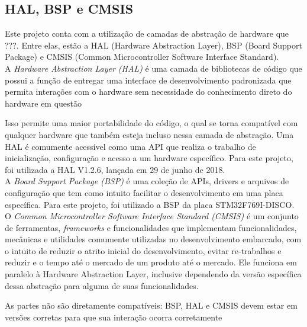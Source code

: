 \subsection{HAL, BSP e CMSIS}
Este projeto conta com a utilização de camadas de abstração de hardware que ???. Entre elas, estão a HAL (Hardware Abstraction Layer), BSP (Board Support Package) e CMSIS (Common Microcontroller Software Interface Standard).
\\[10pt]


A \textit{Hardware Abstraction Layer (HAL)} é uma camada de bibliotecas de código que possui a função de entregar uma interface de desenvolvimento padronizada que permita interações com o hardware sem necessidade do conhecimento direto do hardware em questão 

Isso permite uma maior portabilidade do código, o qual se torna compatível com qualquer hardware que também esteja incluso nessa camada de abstração.
Uma HAL é comumente acessível como uma API que realiza o trabalho de inicialização, configuração e acesso a um hardware específico. Para este projeto, foi utilizada a HAL V1.2.6, lançada em 29 de junho de 2018.
\\[10pt]

A \textit{Board Support Package (BSP)} é uma coleção de APIs, drivers e arquivos de configuração que tem como intuito facilitar o desenvolvimento em uma placa específica. 
Para este projeto, foi utilizado a BSP da placa STM32F769I-DISCO.
\\[10pt]

O \textit{Common Microcontroller Software Interface Standard (CMSIS)} é um conjunto de ferramentas, \textit{frameworks} e funcionalidades que implementam funcionalidades, mecânicas e utilidades comumente utilizadas no desenvolvimento embarcado, com o intuito de reduzir o atrito inicial do desenvolvimento, evitar re-trabalhos e reduzir e o tempo até o mercado de um produto até o mercado. Ele funciona em paralelo à Hardware Abstraction Layer, inclusive dependendo da versão específica dessa abstração para alguma de suas funcionalidades.

\color{orange}
As partes não são diretamente compatíveis: BSP, HAL e CMSIS devem estar em versões corretas para que sua interação ocorra corretamente

